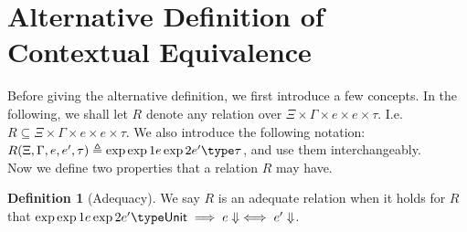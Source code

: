\documentclass[twoside,11pt,openright]{report}
\theoremstyle{definition}
\newtheorem{definition}{Definition}[section]
\newcommand{\expr}{e}
\newcommand{\Tunit}{\mathsf{Unit}}
\newcommand{\typ}{\tau}
\newcommand{\venv}{\Gamma}
\newcommand{\tenv}{\Xi}
\newcommand{\empvenv}{\bullet}
\newcommand{\emptenv}{\bullet}
\def\envscteqgen#1#2\exp1#3\exp2#4\type#5
\begin{document}
\section{Alternative Definition of Contextual Equivalence}
Before giving the alternative definition, we first introduce a few concepts. In the following, we shall let $R$ denote any relation over $\tenv \times \venv \times \expr \times \expr \times \typ$. I.e. $R \subseteq \tenv \times \venv \times \expr \times \expr \times \typ$. We also introduce the following notation: $R(\tenv, \venv, \expr, \expr', \typ) \triangleq \envscteqgen \tenv \venv \exp1 \expr \exp2 \expr' \type \typ$, and use them interchangeably.\\
Now we define two properties that a relation $R$ may have. 
\begin{definition}[Adequacy]
  We say $R$ is an adequate relation when it holds for $R$ that $\envscteqgen \empvenv \emptenv \exp1 \expr \exp2 \expr' \type \Tunit \implies \expr \Downarrow \iff \expr' \Downarrow$.
\end{definition}
\end{document}
